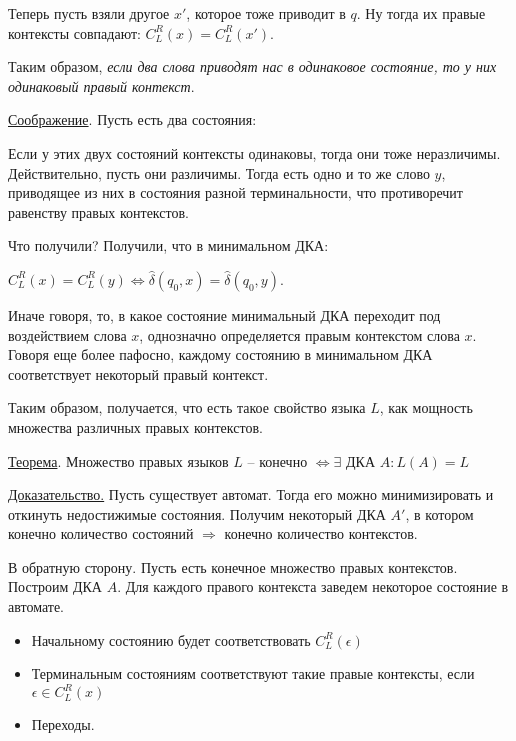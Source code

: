 Теперь пусть взяли другое $ x' $, которое тоже приводит в $ q $. Ну тогда их правые контексты совпадают: $ C_L^R(x) = C_L^R(x') $.

Таким образом, \textit{если два слова приводят нас в одинаковое состояние, то у них одинаковый правый контекст}.

\bigskip

\underline{Соображение}. Пусть есть два состояния: 


Если у этих двух состояний контексты одинаковы, тогда они тоже неразличимы. Действительно, пусть они различимы. Тогда есть одно и то же слово $ y $, приводящее из них в состояния разной терминальности, что противоречит равенству правых контекстов.


\bigskip

Что получили? Получили, что в минимальном ДКА:

$ C_L^R(x) = C_L^R(y) \Leftrightarrow \hat{\delta}(q_0, x) = \hat{\delta}(q_0, y) $. 

Иначе говоря, то, в какое состояние минимальный ДКА переходит под воздействием слова $ x $, однозначно определяется правым контекстом слова $ x $. Говоря еще более пафосно, каждому состоянию в минимальном ДКА соответствует некоторый правый контекст.

Таким образом, получается, что есть такое свойство языка $ L $, как мощность множества различных правых контекстов.

\bigskip

\underline{Теорема}. Множество правых языков $ L $ -- конечно $ \Leftrightarrow \exists $ ДКА $ A \colon  L(A) = L $

\underline{Доказательство.} Пусть существует автомат. Тогда его можно минимизировать и откинуть недостижимые состояния. Получим некоторый ДКА $ A' $, в котором конечно количество состояний $ \Rightarrow $ конечно количество контекстов.

В обратную сторону. Пусть есть конечное множество правых контекстов. Построим ДКА $ A $. Для каждого правого контекста заведем некоторое состояние в автомате.

\begin{itemize}
	\item Начальному состоянию будет соответствовать $ C_L^R(\epsilon) $
	
	\item Терминальным состояниям соответствуют такие правые контексты, если $ \epsilon \in C_L^R(x) $
	
	\item Переходы. 
\end{itemize}

